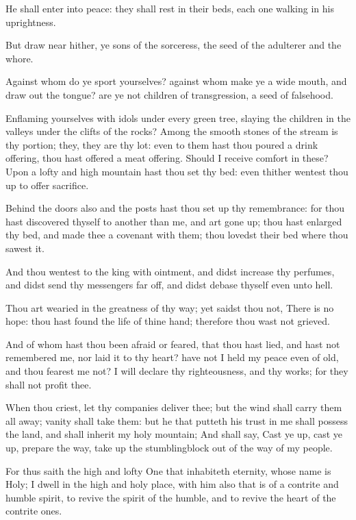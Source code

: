 \Verse He shall enter into peace: they shall rest in their beds, each one walking in his uprightness.

\Verse But draw near hither, ye sons of the sorceress, the seed of the adulterer and the whore.

\Verse Against whom do ye sport yourselves? against whom make ye a wide mouth, and draw out the tongue? are ye not children of transgression, a seed of falsehood.

\Verse Enflaming yourselves with idols under every green tree, slaying the children in the valleys under the clifts of the rocks?  \Verse Among the smooth stones of the stream is thy portion; they, they are thy lot: even to them hast thou poured a drink offering, thou hast offered a meat offering. Should I receive comfort in these?  \Verse Upon a lofty and high mountain hast thou set thy bed: even thither wentest thou up to offer sacrifice.

\Verse Behind the doors also and the posts hast thou set up thy remembrance: for thou hast discovered thyself to another than me, and art gone up; thou hast enlarged thy bed, and made thee a covenant with them; thou lovedst their bed where thou sawest it.

\Verse And thou wentest to the king with ointment, and didst increase thy perfumes, and didst send thy messengers far off, and didst debase thyself even unto hell.

\Verse Thou art wearied in the greatness of thy way; yet saidst thou not, There is no hope: thou hast found the life of thine hand; therefore thou wast not grieved.

\Verse And of whom hast thou been afraid or feared, that thou hast lied, and hast not remembered me, nor laid it to thy heart? have not I held my peace even of old, and thou fearest me not?  \Verse I will declare thy righteousness, and thy works; for they shall not profit thee.

\Verse When thou criest, let thy companies deliver thee; but the wind shall carry them all away; vanity shall take them: but he that putteth his trust in me shall possess the land, and shall inherit my holy mountain; \Verse And shall say, Cast ye up, cast ye up, prepare the way, take up the stumblingblock out of the way of my people.

\Verse For thus saith the high and lofty One that inhabiteth eternity, whose name is Holy; I dwell in the high and holy place, with him also that is of a contrite and humble spirit, to revive the spirit of the humble, and to revive the heart of the contrite ones.

